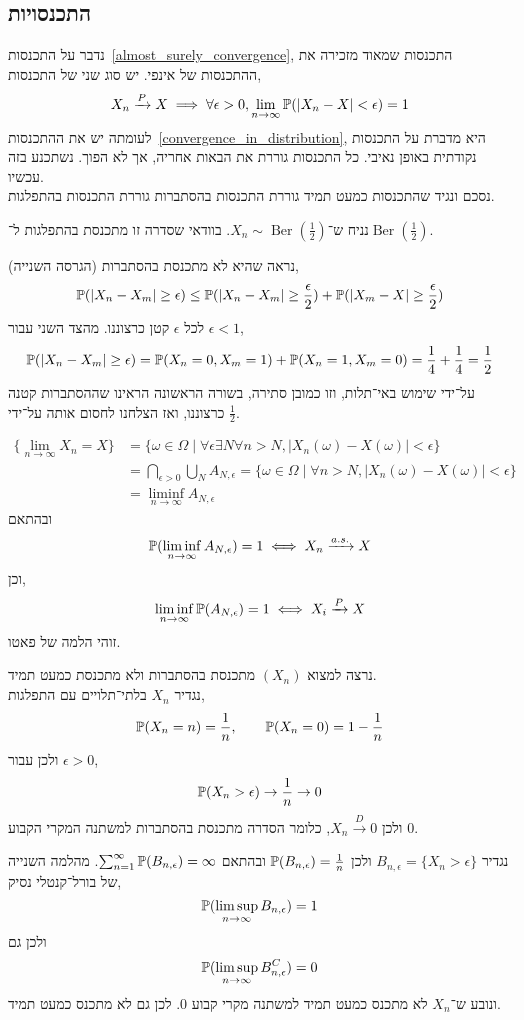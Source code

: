 \subsection{התכנסויות}
נדבר על התכנסות\ \ref{almost_surely_convergence}, התכנסות שמאוד מזכירה את ההתכנסות של אינפי.
יש סוג שני של התכנסות,
\[
	X_n \xrightarrow{P} X \implies \forall \epsilon > 0, \lim_{n \to \infty} \mathbb{P}(|X_n - X| < \epsilon) = 1
\]
לעומתה יש את ההתכנסות\ \ref{convergence_in_distribution}, היא מדברת על התכנסות נקודתית באופן נאיבי.
כל התכנסות גוררת את הבאות אחריה, אך לא הפוך. נשתכנע בזה עכשיו. \\
נסכם ונגיד שהתכנסות כמעט תמיד גוררת התכנסות בהסתברות גוררת התכנסות בהתפלגות.
\begin{example}
	נניח ש־$X_n \sim \operatorname{Ber}(\frac{1}{2})$.
	בוודאי שסדרה זו מתכנסת בהתפלגות ל־$\operatorname{Ber}(\frac{1}{2})$.

	נראה שהיא לא מתכנסת בהסתברות (הגרסה השנייה),
	\[
		\mathbb{P}(|X_n - X_m| \ge \epsilon)
		\le \mathbb{P}(|X_n - X_m| \ge \frac{\epsilon}{2}) + \mathbb{P}(|X_m - X| \ge \frac{\epsilon}{2})
	\]
	לכל $\epsilon$ קטן כרצוננו.
	מהצד השני עבור $\epsilon < 1$,
	\[
		\mathbb{P}(|X_n - X_m| \ge \epsilon)
		= \mathbb{P}(X_n = 0, X_m = 1) + \mathbb{P}(X_n = 1, X_m = 0)
		= \frac{1}{4} + \frac{1}{4} = \frac{1}{2}
	\]
	על־ידי שימוש באי־תלות, וזו כמובן סתירה, בשורה הראשונה הראינו שההסתברות קטנה כרצוננו, ואז הצלחנו לחסום אותה על־ידי $\frac{1}{2}$.
\end{example}
\begin{example}
	\begin{align*}
		\{ \lim_{n \to \infty} X_n = X \}
		& = \{ \omega \in \Omega \mid \forall \epsilon \exists N \forall n > N, |X_n(\omega) - X(\omega)| < \epsilon \} \\
		& = \bigcap_{\epsilon > 0} \bigcup_{N} A_{N, \epsilon} = \{ \omega \in \Omega \mid \forall n > N, |X_n(\omega) - X(\omega)| < \epsilon \} \\
		& = \liminf_{n \to \infty} A_{N, \epsilon}
	\end{align*}
	ובהתאם
	\[
		\mathbb{P}(\liminf_{n \to \infty} A_{N, \epsilon}) = 1 \iff X_n \xrightarrow{a.s.} X
	\]
	וכן,
	\[
		\liminf_{n \to \infty} \mathbb{P}(A_{N, \epsilon}) = 1 \iff X_i \xrightarrow{P} X
	\]
	זוהי הלמה של פאטו.
\end{example}
\begin{example}
	נרצה למצוא $(X_n)$ מתכנסת בהסתברות ולא מתכנסת כמעט תמיד. \\
	נגדיר $X_n$ בלתי־תלויים עם התפלגות,
	\[
		\mathbb{P}(X_n = n) = \frac{1}{n},
		\qquad
		\mathbb{P}(X_n = 0) = 1 - \frac{1}{n}
	\]
	ולכן עבור $\epsilon > 0$,
	\[
		\mathbb{P}(X_n > \epsilon) \to \frac{1}{n} \to 0
	\]
	ולכן $X_n \xrightarrow{D} 0$, כלומר הסדרה מתכנסת בהסתברות למשתנה המקרי הקבוע $0$.

	נגדיר $B_{n, \epsilon} = \{ X_n > \epsilon \}$ ולכן $\mathbb{P}(B_{n, \epsilon}) = \frac{1}{n}$ ובהתאם $\sum_{n = 1}^{\infty} \mathbb{P}(B_{n, \epsilon}) = \infty$.
	מהלמה השנייה של בורל־קנטלי נסיק,
	\[
		\mathbb{P}(\limsup_{n \to \infty} B_{n, \epsilon}) = 1
	\]
	ולכן גם
	\[
		\mathbb{P}(\limsup_{n \to \infty} B_{n, \epsilon}^C) = 0
	\]
	ונובע ש־$X_n$ לא מתכנס כמעט תמיד למשתנה מקרי קבוע $0$.
	לכן גם לא מתכנס כמעט תמיד.
\end{example}

